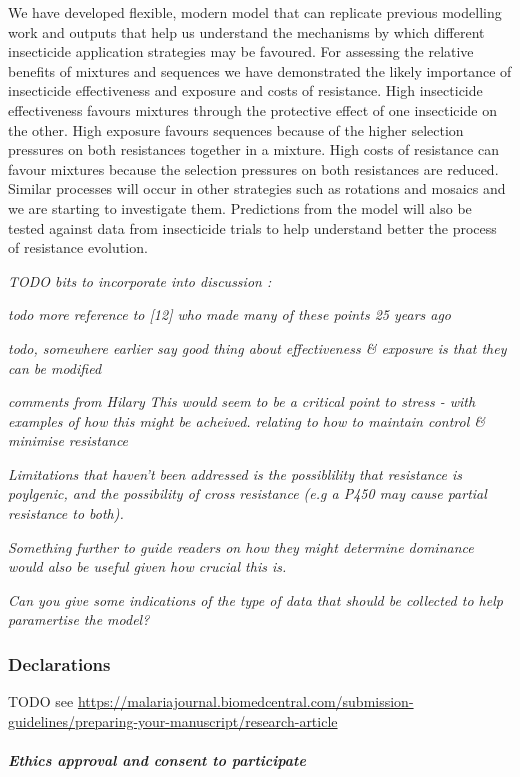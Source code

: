 \documentclass[11pt,]{article}
\let\oldsubparagraph\subparagraph
\renewcommand{\subparagraph}[1]{\oldsubparagraph{#1}\mbox{}}
\begin{document}
We have developed flexible, modern model that can replicate previous
modelling work and outputs that help us understand the mechanisms by
which different insecticide application strategies may be favoured. For
assessing the relative benefits of mixtures and sequences we have
demonstrated the likely importance of insecticide effectiveness and
exposure and costs of resistance. High insecticide effectiveness favours
mixtures through the protective effect of one insecticide on the other.
High exposure favours sequences because of the higher selection
pressures on both resistances together in a mixture. High costs of
resistance can favour mixtures because the selection pressures on both
resistances are reduced. Similar processes will occur in other
strategies such as rotations and mosaics and we are starting to
investigate them. Predictions from the model will also be tested against
data from insecticide trials to help understand better the process of
resistance evolution.

\emph{TODO bits to incorporate into discussion :}

\emph{todo more reference to {[}12{]} who made many of these points 25
years ago}

\emph{todo, somewhere earlier say good thing about effectiveness \&
exposure is that they can be modified}

\emph{comments from Hilary} \emph{This would seem to be a critical point
to stress - with examples of how this might be acheived.} \emph{relating
to how to maintain control \& minimise resistance}

\emph{Limitations that haven't been addressed is the possiblility that
resistance is poylgenic, and the possibility of cross resistance (e.g a
P450 may cause partial resistance to both).}

\emph{Something further to guide readers on how they might determine
dominance would also be useful given how crucial this is.}

\emph{Can you give some indications of the type of data that should be
collected to help paramertise the model?}

\subsubsection{Declarations}\label{declarations}

TODO see
\url{https://malariajournal.biomedcentral.com/submission-guidelines/preparing-your-manuscript/research-article}

\subparagraph{Ethics approval and consent to
participate}\label{ethics-approval-and-consent-to-participate}
\end{document}
